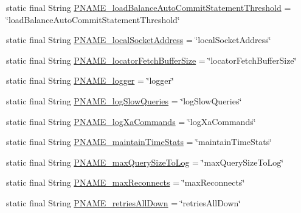 \begin{DoxyCompactItemize}
\item 
static final String \mbox{\hyperlink{classcom_1_1mysql_1_1cj_1_1conf_1_1_property_definitions_abab7b8948ba332d99f2a08f85a47eacd}{P\+N\+A\+M\+E\+\_\+load\+Balance\+Auto\+Commit\+Statement\+Threshold}} = \char`\"{}load\+Balance\+Auto\+Commit\+Statement\+Threshold\char`\"{}
\item 
static final String \mbox{\hyperlink{classcom_1_1mysql_1_1cj_1_1conf_1_1_property_definitions_aeaad222426576734a6bca28c66d00565}{P\+N\+A\+M\+E\+\_\+local\+Socket\+Address}} = \char`\"{}local\+Socket\+Address\char`\"{}
\item 
static final String \mbox{\hyperlink{classcom_1_1mysql_1_1cj_1_1conf_1_1_property_definitions_aa9e12d239be2c6369abc82edd22afc48}{P\+N\+A\+M\+E\+\_\+locator\+Fetch\+Buffer\+Size}} = \char`\"{}locator\+Fetch\+Buffer\+Size\char`\"{}
\item 
static final String \mbox{\hyperlink{classcom_1_1mysql_1_1cj_1_1conf_1_1_property_definitions_a3b57c0f2812c5252f25fb8042c535413}{P\+N\+A\+M\+E\+\_\+logger}} = \char`\"{}logger\char`\"{}
\item 
static final String \mbox{\hyperlink{classcom_1_1mysql_1_1cj_1_1conf_1_1_property_definitions_aea5be22aa8a1f548f8361584398f2b5a}{P\+N\+A\+M\+E\+\_\+log\+Slow\+Queries}} = \char`\"{}log\+Slow\+Queries\char`\"{}
\item 
static final String \mbox{\hyperlink{classcom_1_1mysql_1_1cj_1_1conf_1_1_property_definitions_af3e0561482b8535ac5aff259de82ac11}{P\+N\+A\+M\+E\+\_\+log\+Xa\+Commands}} = \char`\"{}log\+Xa\+Commands\char`\"{}
\item 
static final String \mbox{\hyperlink{classcom_1_1mysql_1_1cj_1_1conf_1_1_property_definitions_a9df90ceb57d1d91292bf61563f5f2a4d}{P\+N\+A\+M\+E\+\_\+maintain\+Time\+Stats}} = \char`\"{}maintain\+Time\+Stats\char`\"{}
\item 
static final String \mbox{\hyperlink{classcom_1_1mysql_1_1cj_1_1conf_1_1_property_definitions_a6cf16aac371a84bbe3f03a4ea83f2588}{P\+N\+A\+M\+E\+\_\+max\+Query\+Size\+To\+Log}} = \char`\"{}max\+Query\+Size\+To\+Log\char`\"{}
\item 
static final String \mbox{\hyperlink{classcom_1_1mysql_1_1cj_1_1conf_1_1_property_definitions_a15c296a8cb68bd7c5c34c791182e312f}{P\+N\+A\+M\+E\+\_\+max\+Reconnects}} = \char`\"{}max\+Reconnects\char`\"{}
\item 
static final String \mbox{\hyperlink{classcom_1_1mysql_1_1cj_1_1conf_1_1_property_definitions_a0b4a5a4a93b6ee5dc813d8303f598bd3}{P\+N\+A\+M\+E\+\_\+retries\+All\+Down}} = \char`\"{}retries\+All\+Down\char`\"{}

\end{DoxyCompactItemize}
